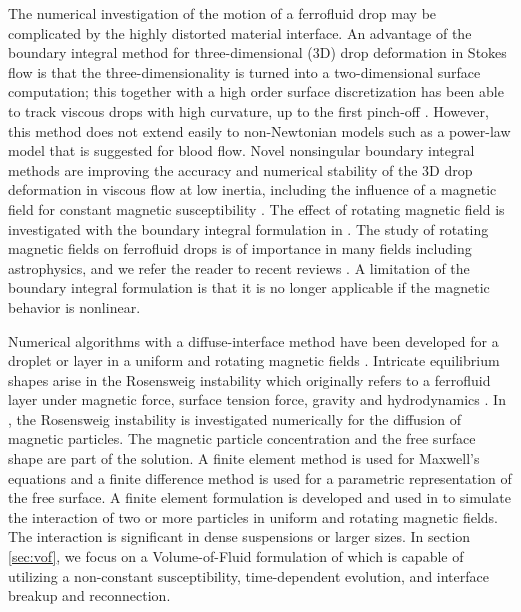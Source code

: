 The numerical investigation of the motion of a ferrofluid drop may be complicated by the highly distorted  material interface. An advantage of 
the boundary integral method for  three-dimensional (3D) drop deformation in Stokes flow is that the three-dimensionality is turned into a  two-dimensional surface 
computation; this together with a high order surface discretization has been able to track viscous drops with high curvature, up to the first pinch-off
\cite{CristiniBLSG,Janssen2008}. However,  this  method  does not extend easily to
non-Newtonian models such as a power-law model that is suggested for blood flow. Novel nonsingular boundary integral methods are improving the accuracy and numerical 
stability of the 3D drop deformation in viscous flow at low inertia, including the influence of a magnetic field for constant  magnetic susceptibility  
\cite{Bazhlekov06}. The effect of rotating magnetic field is investigated with the boundary integral formulation in \cite{Erdmanis2017}. 
The study of  rotating magnetic fields on ferrofluid drops is of importance in many fields including  astrophysics, and we refer the reader to recent reviews 
\cite{Lebedev2003,Fengchen2016}. A limitation of the boundary integral formulation is that it is no longer applicable if the magnetic behavior is nonlinear.

Numerical algorithms with a diffuse-interface method have been developed  
 for a droplet or layer in a uniform and rotating magnetic fields  \cite{Fengchen2016}. Intricate equilibrium shapes arise in the Rosensweig instability which 
originally refers to a ferrofluid layer under magnetic force, surface tension force, gravity and hydrodynamics \cite{Cowley,Rosensweig,Lange2007,Kadau2016}. In 
\cite{Lavrova2012}, the Rosensweig instability is investigated numerically for the diffusion of magnetic particles. The magnetic particle concentration and the free 
surface shape are part of the solution. A finite element method is used for Maxwell's equations and a finite difference method is used for a parametric 
representation of the free surface. 
 A finite element formulation is developed and used in \cite{Kang2013} to simulate the interaction of two or more particles in uniform and rotating magnetic fields. 
The interaction is  significant in  dense suspensions or larger sizes.   In section \ref{sec:vof}, we focus on  a 
Volume-of-Fluid formulation of \cite{ARRRP} which is 
capable of utilizing a non-constant susceptibility,  time-dependent evolution,  and  interface breakup and reconnection.

